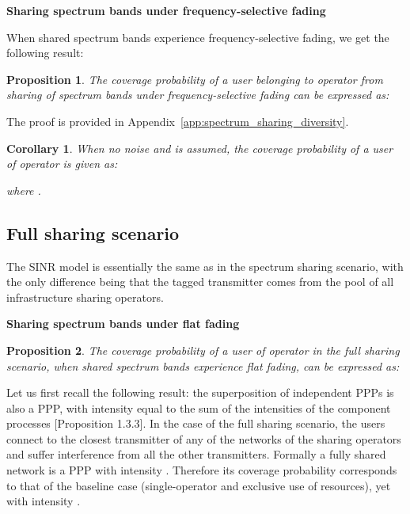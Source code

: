\documentclass[12pt, journal,doublecolumn, final]{IEEEtran}
\newcommand{\App}[1]{Appendix~\ref{app:#1}}
\newtheorem{proposition}{Proposition}
\newtheorem{corollary}{Corollary}
\begin{document}
\noindent
{\bf Sharing spectrum bands under frequency-selective fading}

When shared spectrum bands experience frequency-selective fading, we get the following result:

\begin{proposition}
The coverage probability of a user belonging to operator  from sharing of spectrum bands under frequency-selective fading can be expressed as:

\end{proposition}

\begin{IEEEproof}
The proof is provided in \App{spectrum_sharing_diversity}.
\end{IEEEproof}

\begin{corollary}
When no noise and  is assumed, the coverage probability of a user of operator  is given as:

where .
\label{cor:cp_ppp_spec_nadj_nonoise}
\end{corollary}

\subsection{Full sharing scenario}

The \ac{SINR} model is essentially the same as in the spectrum sharing scenario, with the only difference being that the tagged transmitter comes from the pool of all infrastructure sharing operators.

\noindent
{\bf Sharing spectrum bands under flat fading}

\begin{proposition}
The coverage probability of a user of operator  in the full sharing scenario, when shared spectrum bands experience flat fading, can be expressed as:

\label{prop:full_sharing}
\end{proposition}

\begin{IEEEproof}
Let us first recall the following result: the superposition of independent \acp{PPP} is also a \ac{PPP}, with intensity equal to the sum of the intensities of the component processes \cite{BaccelliBlaszczyszyn_2009}[Proposition 1.3.3]. In the case of the full sharing scenario, the users connect to the closest transmitter of any of the networks of the sharing operators and suffer interference from all the other transmitters. Formally a fully shared network is a \ac{PPP}  with intensity . Therefore its coverage probability corresponds to that of the baseline case (single-operator and exclusive use of resources), yet with intensity .
\end{IEEEproof}
\end{document}
